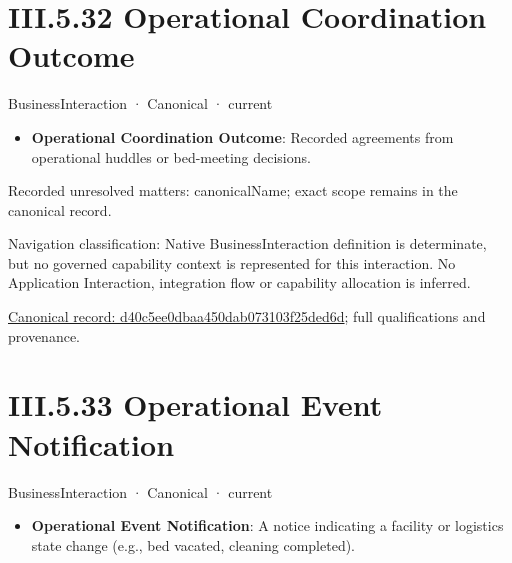 \section*{III.5.32 Operational Coordination Outcome}
\label{navigation:III.5.32}

\label{element:d40c5ee0dbaa450dab073103f25ded6d}
{\small BusinessInteraction · Canonical · current}\par

\begin{itemize}


\item \textbf{Operational Coordination Outcome}: Recorded agreements from operational huddles or bed-meeting decisions.

\end{itemize}

{\small Recorded unresolved matters: canonicalName; exact scope remains in the canonical record.}\par
{\small Navigation classification: Native BusinessInteraction definition is determinate, but no governed capability context is represented for this interaction. No Application Interaction, integration flow or capability allocation is inferred.}\par
{\footnotesize \href{../../../../../../../../continuum/business/business-interaction/d40c5ee0dbaa450dab073103f25ded6d.md}{Canonical record: d40c5ee0dbaa450dab073103f25ded6d}; full qualifications and provenance.}\par
\section*{III.5.33 Operational Event Notification}
\label{navigation:III.5.33}

\label{element:7a2b6e8802e24e018af89f265271f5ca}
{\small BusinessInteraction · Canonical · current}\par

\begin{itemize}


\item \textbf{Operational Event Notification}: A notice indicating a facility or logistics state change (e.g., bed vacated, cleaning completed).

\end{itemize}

